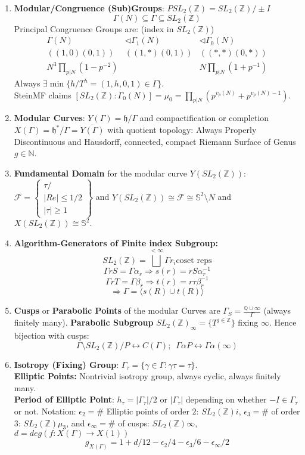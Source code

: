\documentclass{article}
\newcommand{\Q}{\mathbb{Q}}
\newcommand{\Z}{\mathbb{Z}}
\newcommand{\hh}{\mathfrak{h}}
\newcommand{\N}{\mathbb{N}}
\newcommand{\ra}{\rightarrow}
\newcommand{\Ra}{\Rightarrow}
\newcommand{\lra}{\leftrightarrow}
\begin{document}
\begin{multicols}{2}
\begin{enumerate}
\item \textbf{Modular/Congruence (Sub)Groups}: $PSL_2(\Z) = SL_2(\Z)/\pm I$ 
\[\Gamma(N) \subseteq \Gamma \subseteq SL_2(\Z)\]
Principal Congruence Groups are: (index in $SL_2(\Z)$)
\[\begin{array}{ccc} 
 \Gamma(N) & \triangleleft \Gamma_1(N) & \triangleleft \Gamma_0(N)\\
((1,0)(0,1)) & ((1,*)(0,1)) & ((*,*)(0,*)) \\
 N^3\prod_{p|N}(1-p^{-2}) & & N \prod_{p|N}(1+p^{-1}) 
\end{array}\]
Always $\exists \min\{h/T^h = (1,h,0,1)\in \Gamma\}$. \\
SteinMF claims $[SL_2(\Z): \Gamma_0(N)] = \mu_0 = \prod_{p|N} \left(p^{v_p(N)} + p^{v_p(N)-1}\right)$. 

\item \textbf{Modular Curves}: $Y(\Gamma) = \hh/\Gamma$ and compactification or completion $X(\Gamma) = \hh^*/\Gamma = \overline{Y(\Gamma)}$ with quotient topology: Always Properly Discontinuous and Hausdorff, connected, compact Riemann Surface of Genus $g \in \N$. 

\item \textbf{Fundamental Domain} for the modular curve $Y(SL_2(\Z))$: $\mathcal{F} = \left\{\begin{array}{c} \tau / \\ |Re| \leq 1/2 \\ |\tau| \geq 1 \end{array}\right\} $ and $Y(SL_2(\Z)) \cong \mathcal{F} \cong \mathbb{S}^2\setminus N$ and $X(SL_2(\Z)) \cong \mathbb{S}^2$.

\item \textbf{Algorithm-Generators of Finite index Subgroup:} 
\[SL_2(\Z) = \bigsqcup^{< \infty} \Gamma r_i \textrm{coset reps}\] 
\[\Gamma r S = \Gamma \alpha_r \Ra s(r) = rS\alpha_r^{-1}\]
\[ \Gamma r T = \Gamma \beta_r \Ra t(r) = r\tau \beta_r^{-1}\]
\[\Ra \Gamma = \langle s(R) \cup t(R) \rangle\]


\item \textbf{Cusps} or \textbf{Parabolic Points} of the modular Curves are $\Gamma_S = \frac{\Q \cup \infty}{\Gamma}$ (always finitely many). \textbf{Parabolic Subgroup} $SL_2(\Z)_\infty = \{T^{j \in \Z}\} $ fixing $\infty$. Hence bijection with cusps:
\[\Gamma\setminus SL_2(\Z)/P \lra C(\Gamma);\,\,\,\Gamma \alpha P \lra \Gamma \alpha (\infty)\]


\item \textbf{Isotropy (Fixing) Group}: $\Gamma_\tau =\{\gamma \in \Gamma: \gamma\tau = \tau\}$. \\
\textbf{Elliptic Points:} Nontrivial isotropy group, always cyclic, always finitely many.\\
\textbf{Period of Elliptic Point}: $h_\tau = |\Gamma_\tau|/2$ or $|\Gamma_\tau|$ depending on whether $-I \in \Gamma_\tau$ or not. Notation: $\epsilon_2 = \#$ Elliptic points of order $2$: $SL_2(\Z)i$, $\epsilon_3 = \#$ of order $3$: $SL_2(\Z)\mu_3$, and $\epsilon_\infty = \#$ of cusps: $SL_2(\Z)\infty$, $d = deg(f: X(\Gamma) \ra X(1))$ 
\[g_{X(\Gamma)} = 1 + d/12 - \epsilon_2/4 - \epsilon_3/6 - \epsilon_\infty/2\] 





\end{enumerate}
\end{multicols}
\end{document}
